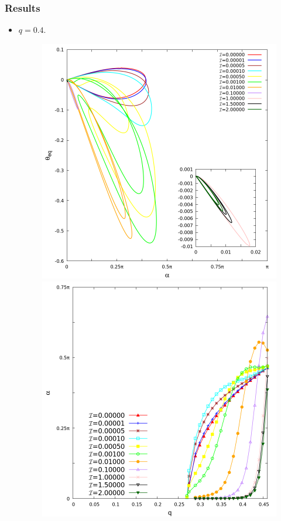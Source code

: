 \documentclass{beamer}
\begin{document}

\begin{frame}
	\frametitle{Results}
	\begin{overlayarea}{\textwidth}{\textheight}
\begin{itemize}
	\item $q=0.4$.
	\begin{figure}
		\begin{minipage}{0.49\linewidth}
			\centering
			\includegraphics[width=\linewidth]{plots/elastic_beam_alpha_theta_eq_q_0.400.png} 
		\end{minipage}
		\hfill
		\begin{minipage}{0.49\linewidth}
			\centering
			\includegraphics[width=\linewidth]{plots/elastic_beam_general.png} 

\end{minipage}
\end{figure}
\end{itemize}
\end{overlayarea}
\end{frame}
\end{document}
